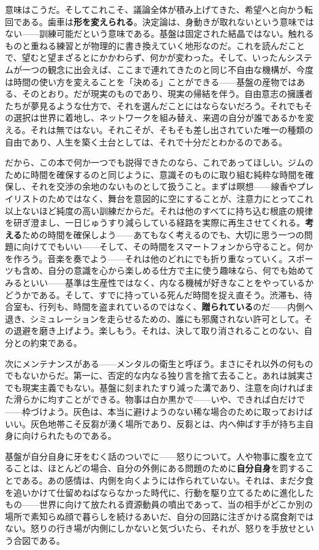 \documentclass[11pt, twoside, openright]{book}
\begin{document}
意味はこうだ。そしてこれこそ、議論全体が積み上げてきた、希望へと向かう転回である。歯車は\textbf{形を変えられる}。決定論は、身動きが取れないという意味ではない------訓練可能だという意味である。基盤は固定された結晶ではない。触れるものと重ねる練習とが物理的に書き換えていく地形なのだ。これを読んだことで、望むと望まざるとにかかわらず、何かが変わった。そして、いったんシステムが一つの観念に出会えば、ここまで連れてきたのと同じ不自由な機構が、今度は時間の使い方を変えることを「決める」ことができる------基盤の産物ではある、そのとおり。だが現実のものであり、現実の帰結を伴う。自由意志の擁護者たちが夢見るような仕方で、それを選んだことにはならないだろう。それでもその選択は世界に着地し、ネットワークを組み替え、来週の自分が誰であるかを変える。それは無ではない。それこそが、そもそも差し出されていた唯一の種類の自由であり、人生を築く土台としては、それで十分だとわかるのである。

だから、この本で何か一つでも説得できたのなら、これであってほしい。ジムのために時間を確保するのと同じように、意識そのものに取り組む純粋な時間を確保し、それを交渉の余地のないものとして扱うこと。まずは瞑想------線香やプレイリストのためではなく、舞台を意図的に空にすることが、注意力にとってこれ以上ないほど純度の高い訓練だからだ。それは他のすべてに持ち込む根底の規律を研ぎ澄まし、一日じゅうすり減らしている経路を実際に再生させてくれる。\textbf{考える}ための時間を確保しよう------あてもなく考えるのでも、大切に思う一つの問題に向けてでもいい------そして、その時間をスマートフォンから守ること。何かを作ろう。音楽を奏でよう------それは他のどれにでも折り重なっていく。スポーツも含め、自分の意識を心から楽しめる仕方で主に使う趣味なら、何でも始めてみるといい------基準は生産性ではなく、内なる機械が好きなことをやっているかどうかである。そして、すでに持っている死んだ時間を捉え直そう。渋滞も、待合室も、行列も、時間を盗まれているのではなく、\textbf{贈られている}のだ------内側へ退き、シミュレーションを走らせるための、誰にも邪魔されない許可として。その退避を磨き上げよう。楽しもう。それは、決して取り消されることのない、自分との約束である。

次にメンテナンスがある------メンタルの衛生と呼ぼう。まさにそれ以外の何ものでもないからだ。第一に、否定的な内なる独り言を捨て去ること。あれは誠実さでも現実主義でもない。基盤に刻まれたすり減った溝であり、注意を向ければまた滑らかに均すことができる。物事は白か黒かで------いや、できれば白だけで------枠づけよう。灰色は、本当に避けようのない稀な場合のために取っておけばいい。灰色地帯こそ反芻が湧く場所であり、反芻とは、内へ伸ばす手が持ち主自身に向けられたものである。

基盤が自分自身に牙をむく話のついでに------怒りについて。人や物事に腹を立てることは、ほとんどの場合、自分の外側にある問題のために\textbf{自分自身}を罰することである。あの感情は、内側を向くようには作られていない。それは、まだ夕食を追いかけて仕留めねばならなかった時代に、行動を駆り立てるために進化したもの------世界に向けて放たれる資源動員の噴出であって、当の相手がどこか別の場所で素知らぬ顔で暮らしを続けるあいだ、自分の回路に注ぎかける腐食剤ではない。怒りの行き場が内側にしかないと気づいたら、それが、怒りを手放せという合図である。
\end{document}
